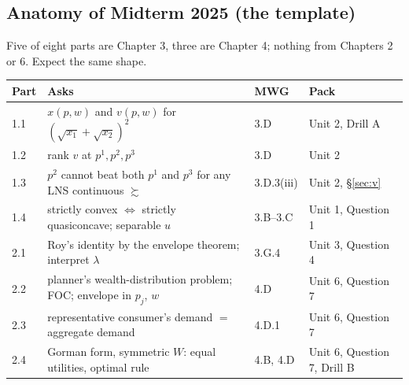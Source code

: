 \documentclass[11pt]{article}
\newcommand{\pref}{\succsim}
\begin{document}
\subsection*{Anatomy of Midterm 2025 (the template)}
Five of eight parts are Chapter 3, three are Chapter 4; nothing from Chapters 2 or 6. Expect the same shape.
\begin{center}\small
\begin{tabular}{p{1.2cm}p{7.6cm}p{2.6cm}p{3.4cm}}
\toprule
Part & Asks & MWG & Pack\\
\midrule
1.1 & $x(p,w)$ and $v(p,w)$ for $(\sqrt{x_1}+\sqrt{x_2})^2$ & 3.D & Unit 2, Drill A\\
1.2 & rank $v$ at $p^1,p^2,p^3$ & 3.D & Unit 2\\
1.3 & $p^2$ cannot beat both $p^1$ and $p^3$ for any LNS continuous $\pref$ & 3.D.3(iii) & Unit 2, \S\ref{sec:v}\\
1.4 & strictly convex $\iff$ strictly quasiconcave; separable $u$ & 3.B--3.C & Unit 1, Question 1\\
2.1 & Roy's identity by the envelope theorem; interpret $\lambda$ & 3.G.4 & Unit 3, Question 4\\
2.2 & planner's wealth-distribution problem; FOC; envelope in $p_j$, $w$ & 4.D & Unit 6, Question 7\\
2.3 & representative consumer's demand $=$ aggregate demand & 4.D.1 & Unit 6, Question 7\\
2.4 & Gorman form, symmetric $W$: equal utilities, optimal rule & 4.B, 4.D & Unit 6, Question 7, Drill B\\
\bottomrule
\end{tabular}
\end{center}
\end{document}
